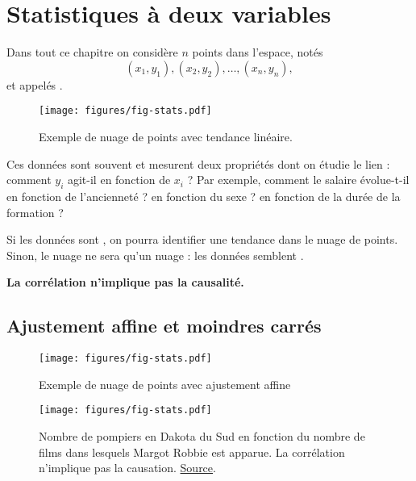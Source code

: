 
\chapter{Statistiques à deux variables}

Dans tout ce chapitre on considère $n$ points dans l'espace, notés 
	\[ (x_1, y_1), (x_2, y_2), \dots, (x_n, y_n), \]
et appelés .


\begin{figure}
	\centering
	\texttt{[image: figures/fig-stats.pdf]}
	\caption{Exemple de nuage de points avec tendance linéaire.}
\end{figure}

Ces données sont souvent  et mesurent deux propriétés dont on étudie le lien : comment $y_i$ agit-il en fonction de $x_i$ ?
Par exemple, comment le salaire évolue-t-il en fonction de l'ancienneté ? en fonction du sexe ? en fonction de la durée de la formation ?

Si les données sont , on pourra identifier une tendance dans le nuage de points.
Sinon, le nuage ne sera qu'un nuage : les données semblent .

\textbf{\warning La corrélation n'implique pas la causalité.}

\section{Ajustement affine et moindres carrés}

\begin{figure}
	\centering
	\texttt{[image: figures/fig-stats.pdf]}
	\caption{Exemple de nuage de points avec ajustement affine}
\end{figure}



\begin{figure}
	\centering
	\texttt{[image: figures/fig-stats.pdf]}
	\caption{Nombre de pompiers en Dakota du Sud en fonction du nombre de films dans lesquels Margot Robbie est apparue. La corrélation n'implique pas la causation. \href{https://www.tylervigen.com/spurious/correlation/5846_the-number-of-movies-margot-robbie-appeared-in_correlates-with_the-number-of-firefighters-in-south-dakota}{Source}.}
\end{figure}


